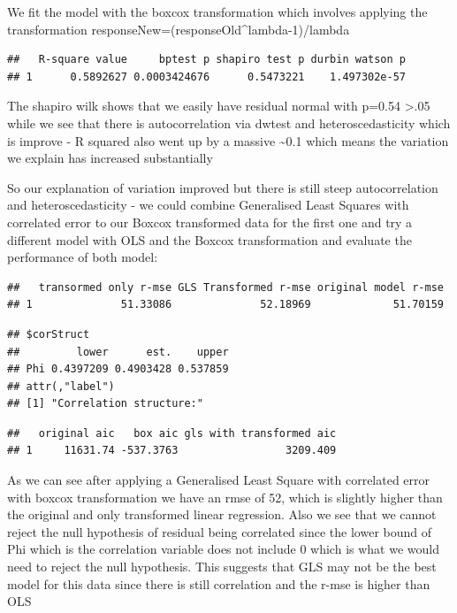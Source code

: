 \documentclass[
]{article}
\begin{document}
We fit the model with the boxcox transformation which involves applying
the transformation responseNew=(responseOld\^{}lambda-1)/lambda

\begin{verbatim}
##   R-square value     bptest p shapiro test p durbin watson p
## 1      0.5892627 0.0003424676      0.5473221    1.497302e-57
\end{verbatim}

The shapiro wilk shows that we easily have residual normal with p=0.54
\textgreater.05 while we see that there is autocorrelation via dwtest
and heteroscedasticity which is improve - R squared also went up by a
massive \textasciitilde0.1 which means the variation we explain has
increased substantially

So our explanation of variation improved but there is still steep
autocorrelation and heteroscedasticity - we could combine Generalised
Least Squares with correlated error to our Boxcox transformed data for
the first one and try a different model with OLS and the Boxcox
transformation and evaluate the performance of both model:

\begin{verbatim}
##   transormed only r-mse GLS Transformed r-mse original model r-mse
## 1              51.33086              52.18969             51.70159
\end{verbatim}

\begin{verbatim}
## $corStruct
##         lower      est.    upper
## Phi 0.4397209 0.4903428 0.537859
## attr(,"label")
## [1] "Correlation structure:"
\end{verbatim}

\begin{verbatim}
##   original aic   box aic gls with transformed aic
## 1     11631.74 -537.3763                 3209.409
\end{verbatim}

As we can see after applying a Generalised Least Square with correlated
error with boxcox transformation we have an rmse of 52, which is
slightly higher than the original and only transformed linear
regression. Also we see that we cannot reject the null hypothesis of
residual being correlated since the lower bound of Phi which is the
correlation variable does not include 0 which is what we would need to
reject the null hypothesis. This suggests that GLS may not be the best
model for this data since there is still correlation and the r-mse is
higher than OLS
\end{document}

